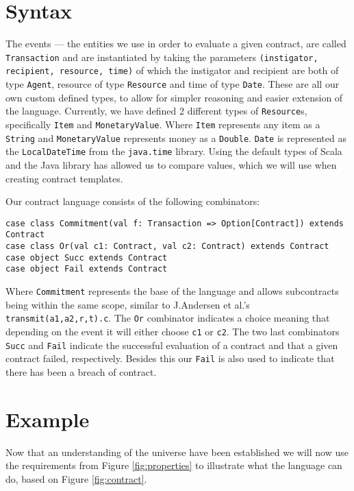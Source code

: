 \documentclass{ituthesis}
\begin{document}
\section{Syntax}
\label{syntax}
The events --- the entities we use in order to evaluate a given contract, are called \texttt{Transaction} and are instantiated by taking the parameters \texttt{(instigator, recipient, resource, time)} of which the instigator and recipient are both of type \texttt{Agent}, resource of type \texttt{Resource} and time of type \texttt{Date}. These are all our own custom defined types, to allow for simpler reasoning and easier extension of the language. Currently, we have defined 2 different types of \texttt{Resource}s, specifically \texttt{Item} and \texttt{MonetaryValue}. Where \texttt{Item} represents any item as a \texttt{String} and \texttt{MonetaryValue} represents money as a \texttt{Double}. \texttt{Date} is represented as the \texttt{LocalDateTime} from the \texttt{java.time} library. Using the default types of Scala and the Java library has allowed us to compare values, which we will use when creating contract templates.

Our contract language consists of the following combinators:
\begin{lstlisting}
case class Commitment(val f: Transaction => Option[Contract]) extends Contract
case class Or(val c1: Contract, val c2: Contract) extends Contract
case object Succ extends Contract
case object Fail extends Contract
\end{lstlisting}

Where \texttt{Commitment} represents the base of the language and allows subcontracts being within the same scope, similar to J.Andersen et al.'s \texttt{transmit(a1,a2,r,t).c}. The \texttt{Or} combinator indicates a choice meaning that depending on the event it will either choose \texttt{c1} or \texttt{c2}. The two last combinators \texttt{Succ} and \texttt{Fail} indicate the successful evaluation of a contract and that a given contract failed, respectively. Besides this our \texttt{Fail} is also used to indicate that there has been a breach of contract.

\section{Example}

Now that an understanding of the universe have been established we will now use the requirements from Figure \ref{fig:properties} to illustrate what the language can do, based on Figure \ref{fig:contract}.
\end{document}
